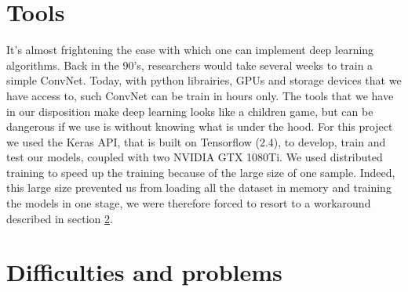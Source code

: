 \documentclass[12pt, a4paper]{report}
\begin{document}
		\section{Tools}
			It's almost frightening the ease with which one can implement deep learning algorithms.
			Back in the 90's, researchers would take several weeks to train a simple ConvNet.
			Today, with python librairies, GPUs and storage devices that we have access to, such ConvNet can be train in hours only.
			The tools that we have in our disposition make deep learning looks like a children game, but can be dangerous if we use is without knowing what is under the hood.
			For this project we used the Keras API, that is built on Tensorflow (2.4), to develop, train and test our models, coupled with two NVIDIA GTX 1080Ti.
			We used distributed training to speed up the training because of the large size of one sample.
			Indeed, this large size prevented us from loading all the dataset in memory and training the models in one stage, we were therefore forced to resort to a workaround described in section \ref{difficulties}.
		\section{Difficulties and problems}\label{difficulties}
\end{document}
